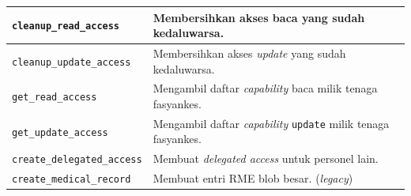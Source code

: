\documentclass[bahasa, 12pt, a4paper, onecolumn, oneside, final]{report}
\begin{document}
\begin{longtable}{|Y{0.45\textwidth}|Y{0.47\textwidth}|}
	\texttt{cleanup\_read\_access}            & Membersihkan akses baca yang sudah kedaluwarsa.                                        \\ \hline
	\texttt{cleanup\_update\_access}          & Membersihkan akses \textit{update} yang sudah kedaluwarsa.                             \\ \hline
	\texttt{get\_read\_access}                & Mengambil daftar \textit{capability} baca milik tenaga fasyankes.                      \\ \hline
	\texttt{get\_update\_access}              & Mengambil daftar \textit{capability} \texttt{update} milik tenaga fasyankes.           \\ \hline
	\texttt{create\_delegated\_access}        & Membuat \textit{delegated access} untuk personel lain.                                 \\ \hline
	\texttt{create\_medical\_record}          & Membuat entri RME blob besar. (\textit{legacy})                                        \\ \hline
\end{longtable}
\end{document}
